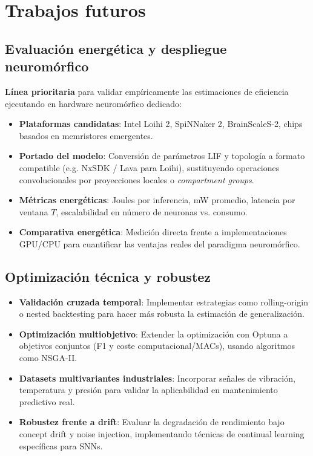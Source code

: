 \section{Trabajos futuros}

\subsection{Evaluación energética y despliegue neuromórfico}
\label{subsec:trabajo-futuro-neuromorfico}
\textbf{Línea prioritaria} para validar empíricamente las estimaciones de eficiencia ejecutando en hardware neuromórfico dedicado:
\begin{itemize}
    \item \textbf{Plataformas candidatas}: Intel Loihi 2, SpiNNaker 2, BrainScaleS-2, chips basados en memristores emergentes.
    \item \textbf{Portado del modelo}: Conversión de parámetros LIF y topología a formato compatible (e.g. NxSDK / Lava para Loihi), sustituyendo operaciones convolucionales por proyecciones locales o \textit{compartment groups}.
    \item \textbf{Métricas energéticas}: Joules por inferencia, mW promedio, latencia por ventana \(T\), escalabilidad en número de neuronas vs. consumo.
    \item \textbf{Comparativa energética}: Medición directa frente a implementaciones GPU/CPU para cuantificar las ventajas reales del paradigma neuromórfico.
\end{itemize}

\subsection{Optimización técnica y robustez}
\begin{itemize}
    \item \textbf{Validación cruzada temporal}: Implementar estrategias como rolling-origin o nested backtesting para hacer más robusta la estimación de generalización.
    \item \textbf{Optimización multiobjetivo}: Extender la optimización con Optuna a objetivos conjuntos (F1 y coste computacional/MACs), usando algoritmos como NSGA-II.
    \item \textbf{Datasets multivariantes industriales}: Incorporar señales de vibración, temperatura y presión para validar la aplicabilidad en mantenimiento predictivo real.
    \item \textbf{Robustez frente a drift}: Evaluar la degradación de rendimiento bajo concept drift y noise injection, implementando técnicas de continual learning específicas para SNNs.
\end{itemize}


